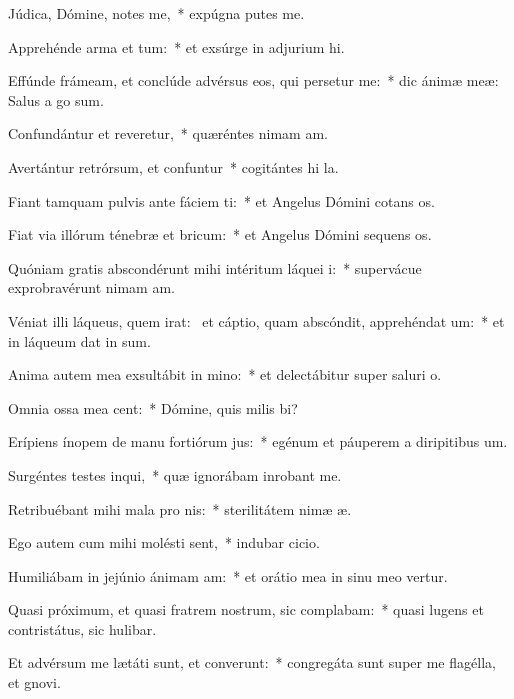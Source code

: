 \item Júdica, Dómine, notes me,~* expúgna putes me.
\item Apprehénde arma et tum:~* et exsúrge in adjurium hi.
\item Effúnde frámeam, et conclúde advérsus eos, qui persetur me:~* dic ánimæ meæ: Salus a go sum.
\item Confundántur et reveretur,~* quæréntes nimam am.
\item Avertántur retrórsum, et confuntur~* cogitántes hi la.
\item Fiant tamquam pulvis ante fáciem ti:~* et Angelus Dómini cotans os.
\item Fiat via illórum ténebræ et bricum:~* et Angelus Dómini sequens os.
\item Quóniam gratis abscondérunt mihi intéritum láquei i:~* supervácue exprobravérunt nimam am.
\item Véniat illi láqueus, quem irat:~\pscross{} et cáptio, quam abscóndit, apprehéndat um:~* et in láqueum dat in sum.
\item Anima autem mea exsultábit in mino:~* et delectábitur super saluri o.
\item Omnia ossa mea cent:~* Dómine, quis milis bi?
\item Erípiens ínopem de manu fortiórum jus:~* egénum et páuperem a diripitibus um.
\item Surgéntes testes inqui,~* quæ ignorábam inrobant me.
\item Retribuébant mihi mala pro nis:~* sterilitátem nimæ æ.
\item Ego autem cum mihi molésti sent,~* indubar cicio.
\item Humiliábam in jejúnio ánimam am:~* et orátio mea in sinu meo vertur.
\item Quasi próximum, et quasi fratrem nostrum, sic complabam:~* quasi lugens et contristátus, sic hulibar.
\item Et advérsum me lætáti sunt, et converunt:~* congregáta sunt super me flagélla, et gnovi.
